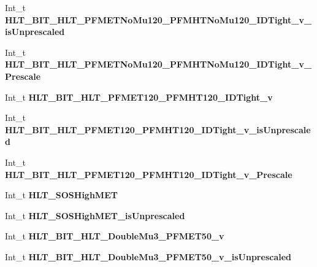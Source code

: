 \begin{DoxyCompactItemize}
Int\+\_\+t {\bfseries H\+L\+T\+\_\+\+B\+I\+T\+\_\+\+H\+L\+T\+\_\+\+P\+F\+M\+E\+T\+No\+Mu120\+\_\+\+P\+F\+M\+H\+T\+No\+Mu120\+\_\+\+I\+D\+Tight\+\_\+v\+\_\+is\+Unprescaled}
\item 
\hypertarget{classMiniTree_a34d4cf72e4df5728268825fbbc529623}{}\label{classMiniTree_a34d4cf72e4df5728268825fbbc529623} 
Int\+\_\+t {\bfseries H\+L\+T\+\_\+\+B\+I\+T\+\_\+\+H\+L\+T\+\_\+\+P\+F\+M\+E\+T\+No\+Mu120\+\_\+\+P\+F\+M\+H\+T\+No\+Mu120\+\_\+\+I\+D\+Tight\+\_\+v\+\_\+\+Prescale}
\item 
\hypertarget{classMiniTree_a3ad4305512c4c97f00b2b5644316f644}{}\label{classMiniTree_a3ad4305512c4c97f00b2b5644316f644} 
Int\+\_\+t {\bfseries H\+L\+T\+\_\+\+B\+I\+T\+\_\+\+H\+L\+T\+\_\+\+P\+F\+M\+E\+T120\+\_\+\+P\+F\+M\+H\+T120\+\_\+\+I\+D\+Tight\+\_\+v}
\item 
\hypertarget{classMiniTree_af6bcee0458c09d157f6e9431aa450812}{}\label{classMiniTree_af6bcee0458c09d157f6e9431aa450812} 
Int\+\_\+t {\bfseries H\+L\+T\+\_\+\+B\+I\+T\+\_\+\+H\+L\+T\+\_\+\+P\+F\+M\+E\+T120\+\_\+\+P\+F\+M\+H\+T120\+\_\+\+I\+D\+Tight\+\_\+v\+\_\+is\+Unprescaled}
\item 
\hypertarget{classMiniTree_a17e15b5d8f4f33dd67e9948fbc62da40}{}\label{classMiniTree_a17e15b5d8f4f33dd67e9948fbc62da40} 
Int\+\_\+t {\bfseries H\+L\+T\+\_\+\+B\+I\+T\+\_\+\+H\+L\+T\+\_\+\+P\+F\+M\+E\+T120\+\_\+\+P\+F\+M\+H\+T120\+\_\+\+I\+D\+Tight\+\_\+v\+\_\+\+Prescale}
\item 
\hypertarget{classMiniTree_ab50140cbec0cefaf9f3915e95fcde1aa}{}\label{classMiniTree_ab50140cbec0cefaf9f3915e95fcde1aa} 
Int\+\_\+t {\bfseries H\+L\+T\+\_\+\+S\+O\+S\+High\+M\+ET}
\item 
\hypertarget{classMiniTree_a9654fb75eb2995f3dc66e01d2fd70582}{}\label{classMiniTree_a9654fb75eb2995f3dc66e01d2fd70582} 
Int\+\_\+t {\bfseries H\+L\+T\+\_\+\+S\+O\+S\+High\+M\+E\+T\+\_\+is\+Unprescaled}
\item 
\hypertarget{classMiniTree_a6cab68c34f50e53476340332e4fdf2c1}{}\label{classMiniTree_a6cab68c34f50e53476340332e4fdf2c1} 
Int\+\_\+t {\bfseries H\+L\+T\+\_\+\+B\+I\+T\+\_\+\+H\+L\+T\+\_\+\+Double\+Mu3\+\_\+\+P\+F\+M\+E\+T50\+\_\+v}
\item 
\hypertarget{classMiniTree_a0e31e02cc4ccccef7e76b1b60aa5dd4a}{}\label{classMiniTree_a0e31e02cc4ccccef7e76b1b60aa5dd4a} 
Int\+\_\+t {\bfseries H\+L\+T\+\_\+\+B\+I\+T\+\_\+\+H\+L\+T\+\_\+\+Double\+Mu3\+\_\+\+P\+F\+M\+E\+T50\+\_\+v\+\_\+is\+Unprescaled}
\item 
\hypertarget{classMiniTree_ac69a6d64952db5902adf95f1fb399d02}{}\label{classMiniTree_ac69a6d64952db5902adf95f1fb399d02} 

\end{DoxyCompactItemize}
